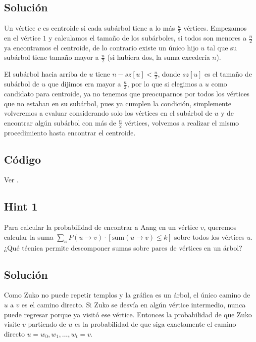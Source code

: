 \subsection*{Solución}
Un vértice $c$ es centroide si cada subárbol tiene a lo más $\frac{n}{2}$ vértices. Empezamos en el vértice $1$ y calculamos el tamaño de los subárboles, si todos son menores a $\frac{n}{2}$ ya encontramos el centroide, de lo contrario existe un único hijo $u$ tal que su subárbol tiene tamaño mayor a $\frac{n}{2}$ (si hubiera dos, la suma excedería $n$). 

El subárbol hacia arriba de $u$ tiene $n-sz[u] < \frac{n}{2}$, donde $sz[u]$ es el tamaño de subárbol de $u$ que dijimos era mayor a $\frac{n}{2}$, por lo que si elegimos a $u$ como candidato para centroide, ya no tenemos que preocuparnos por todos los vértices que no estaban en su subárbol, pues ya cumplen la condición, simplemente volveremos a evaluar considerando solo los vértices en el subárbol de $u$ y de encontrar algún subárbol con más de $\frac{n}{2}$ vértices, volvemos a realizar el mismo procedimiento hasta encontrar el centroide.
\subsection*{Código}
Ver .

\subsection*{Hint 1}
Para calcular la probabilidad de encontrar a Aang en un vértice $v$, queremos calcular la suma
$\sum_u P(u \to v) \cdot [\text{sum}(u \to v) \leq k]$
sobre todos los vértices $u$. ¿Qué técnica permite descomponer
sumas sobre pares de vértices en un árbol?
 
\subsection*{Solución}
 
Como Zuko no puede repetir templos y la gráfica es un árbol, el
único camino de $u$ a $v$ es el camino directo. Si Zuko se desvía
en algún vértice intermedio, nunca puede regresar porque ya visitó ese
vértice. Entonces la probabilidad de que Zuko visite $v$ partiendo
de $u$ es la probabilidad de que siga exactamente el camino
directo $u = w_0, w_1, \ldots, w_t = v$.
 
